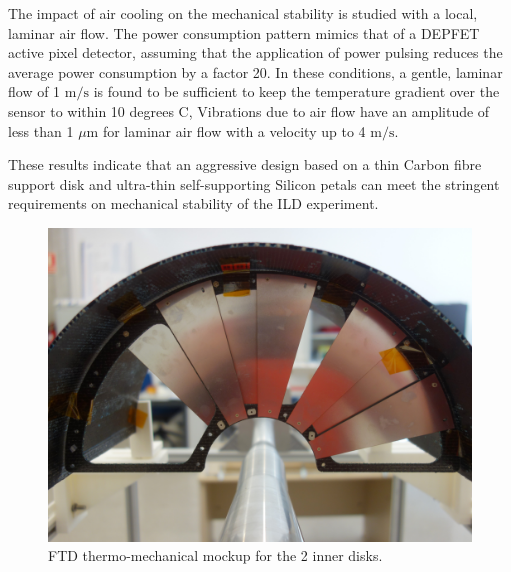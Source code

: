 The impact of air cooling on the mechanical stability is studied with a local, 
laminar air flow. The power consumption pattern mimics that of a DEPFET
active pixel detector, assuming that the application of power pulsing reduces
the average power consumption by a factor 20.
In these conditions, a gentle, laminar flow of 1 $\mathrm{m/s}$ is found to be sufficient
to keep the temperature gradient over the sensor to within 10 degrees C, 
Vibrations due to air flow have an  amplitude of less than 1 $\mu \mathrm{m}$ 
for laminar air flow with a velocity up to 4 $\mathrm{m/s}$. 

These results indicate that an aggressive design based on a thin Carbon fibre
support disk and ultra-thin self-supporting Silicon petals can meet the 
stringent requirements on mechanical stability of the ILD experiment.





\begin{figure}[t!]
\centering
\includegraphics[width=0.6\hsize]{Detector/fig/FTD_mockup.jpg}
\caption{FTD thermo-mechanical mockup for the 2 inner disks.}
\label{fig:det:FTD_mockup}
\end{figure}


\vspace{2cm}
